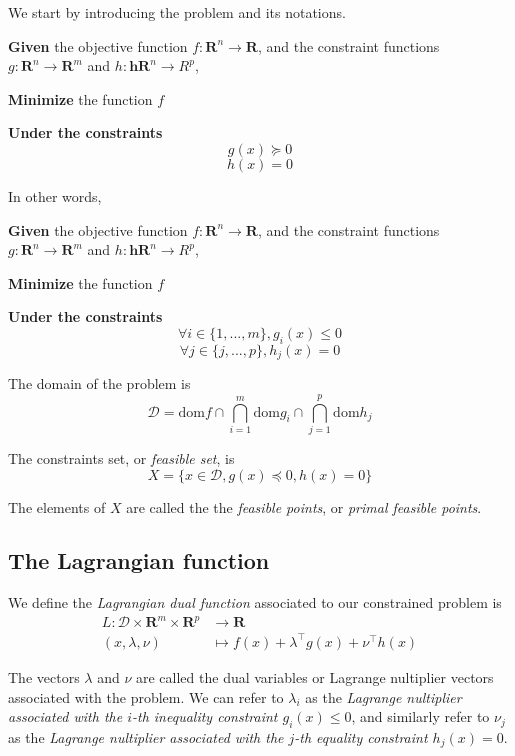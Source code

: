 We start by introducing the problem and its notations.

\begin{problem}
    \textbf{Given} the objective function $ f : \mathbf R^n \to \mathbf R $, and the constraint functions $ g : \mathbf R^n \to \mathbf R^m $ and $ h : \mathbf h \mathbf R^n \to R^p $,

    \textbf{Minimize} the function $ f $

    \textbf{Under the constraints}
    \[
        g(x) \succeq 0
    \]
    \[
        h(x) = 0
    \]
\end{problem}

In other words,

\begin{problem}
    \textbf{Given} the objective function $ f : \mathbf R^n \to \mathbf R $, and the constraint functions $ g : \mathbf R^n \to \mathbf R^m $ and $ h : \mathbf h \mathbf R^n \to R^p $,

    \textbf{Minimize} the function $ f $

    \textbf{Under the constraints}
    \[
        \forall i \in \{ 1, ..., m \}, g_i(x) \leqslant  0
    \]
    \[
        \forall j \in \{ j, ..., p \}, h_j(x) = 0
    \]
\end{problem}

\begin{definition}
    The domain of the problem is
    \[
        \mathcal D = \mathrm{dom} f \cap \bigcap_{i=1}^m \mathrm{dom} g_i \cap \bigcap_{j=1}^p \mathrm{dom} h_j
    \]

    The constraints set, or \textit{feasible set}, is
    \[
        X = \{ x \in \mathcal D, g(x) \preceq 0, h(x) = 0 \}
    \]

    The elements of $ X $ are called the the \textit{feasible points}, or \textit{primal feasible points}.
\end{definition}

\subsection{The Lagrangian function}

\begin{definition}
    We define the \textit{Lagrangian dual function} associated to our constrained problem is
    \[
        \begin{aligned}
            L : \mathcal D \times \mathbf R^m \times \mathbf R^p & \longrightarrow \mathbf R \\
            (x,\lambda,\nu) & \longmapsto f(x) + \lambda^\top g(x) + \nu^\top h(x)
        \end{aligned}    
    \]

    The vectors $ \lambda $ and $ \nu $ are called the dual variables or Lagrange nultiplier vectors associated with the problem. We can refer to $ \lambda_i $ as the \textit{Lagrange nultiplier associated with the $i$-th inequality constraint $ g_i(x) \leqslant 0 $}, and similarly refer to $ \nu_j $ as the \textit{Lagrange nultiplier associated with the $j$-th equality constraint $ h_j(x) = 0 $}.
\end{definition}

